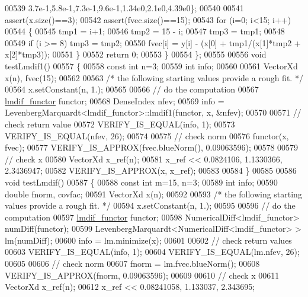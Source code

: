 \begin{DoxyCode}
00539             3.7e-1,5.8e-1,7.3e-1,9.6e-1,1.34e0,2.1e0,4.39e0\};
00540 
00541         assert(x.size()==3);
00542         assert(fvec.size()==15);
00543         \textcolor{keywordflow}{for} (i=0; i<15; i++)
00544         \{
00545             tmp1 = i+1;
00546             tmp2 = 15 - i;
00547             tmp3 = tmp1;
00548 
00549             \textcolor{keywordflow}{if} (i >= 8) tmp3 = tmp2;
00550             fvec[i] = y[i] - (x[0] + tmp1/(x[1]*tmp2 + x[2]*tmp3));
00551         \}
00552         \textcolor{keywordflow}{return} 0;
00553     \}
00554 \};
00555 
00556 \textcolor{keywordtype}{void} testLmdif1()
00557 \{
00558   \textcolor{keyword}{const} \textcolor{keywordtype}{int} n=3;
00559   \textcolor{keywordtype}{int} info;
00560 
00561   VectorXd x(n), fvec(15);
00562 
00563   \textcolor{comment}{/* the following starting values provide a rough fit. */}
00564   x.setConstant(n, 1.);
00565 
00566   \textcolor{comment}{// do the computation}
00567   \hyperlink{structlmdif__functor}{lmdif\_functor} functor;
00568   DenseIndex nfev;
00569   info = LevenbergMarquardt<lmdif\_functor>::lmdif1(functor, x, &nfev);
00570 
00571   \textcolor{comment}{// check return value}
00572   VERIFY\_IS\_EQUAL(info, 1);
00573   VERIFY\_IS\_EQUAL(nfev, 26);
00574 
00575   \textcolor{comment}{// check norm}
00576   functor(x, fvec);
00577   VERIFY\_IS\_APPROX(fvec.blueNorm(), 0.09063596);
00578 
00579   \textcolor{comment}{// check x}
00580   VectorXd x\_ref(n);
00581   x\_ref << 0.0824106, 1.1330366, 2.3436947;
00582   VERIFY\_IS\_APPROX(x, x\_ref);
00583 
00584 \}
00585 
00586 \textcolor{keywordtype}{void} testLmdif()
00587 \{
00588   \textcolor{keyword}{const} \textcolor{keywordtype}{int} m=15, n=3;
00589   \textcolor{keywordtype}{int} info;
00590   \textcolor{keywordtype}{double} fnorm, covfac;
00591   VectorXd x(n);
00592 
00593   \textcolor{comment}{/* the following starting values provide a rough fit. */}
00594   x.setConstant(n, 1.);
00595 
00596   \textcolor{comment}{// do the computation}
00597   \hyperlink{structlmdif__functor}{lmdif\_functor} functor;
00598   NumericalDiff<lmdif\_functor> numDiff(functor);
00599   LevenbergMarquardt<NumericalDiff<lmdif\_functor> > lm(numDiff);
00600   info = lm.minimize(x);
00601 
00602   \textcolor{comment}{// check return values}
00603   VERIFY\_IS\_EQUAL(info, 1);
00604   VERIFY\_IS\_EQUAL(lm.nfev, 26);
00605 
00606   \textcolor{comment}{// check norm}
00607   fnorm = lm.fvec.blueNorm();
00608   VERIFY\_IS\_APPROX(fnorm, 0.09063596);
00609 
00610   \textcolor{comment}{// check x}
00611   VectorXd x\_ref(n);
00612   x\_ref << 0.08241058, 1.133037, 2.343695;

\end{DoxyCode}
